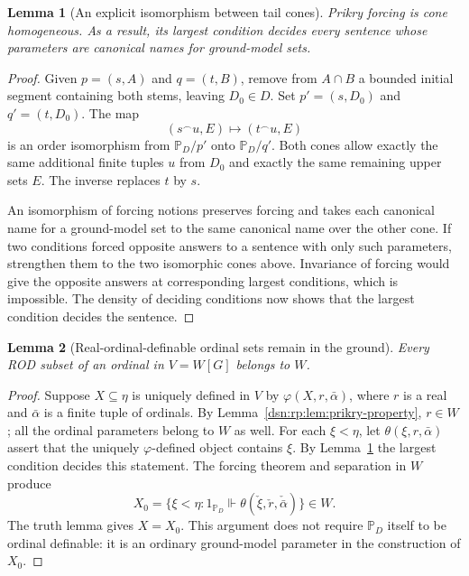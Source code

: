 \documentclass[11pt,a4paper]{article}
\numberwithin{equation}{section}
\newtheorem{lemma}[lemma]{Lemma}
\theoremstyle{definition}
\theoremstyle{remark}
\begin{document}
\begin{lemma}[An explicit isomorphism between tail cones]
\label{dsn:rp:lem:prikry-cones}
Prikry forcing is cone homogeneous.  As a result, its largest
condition decides every sentence whose parameters are canonical
names for ground-model sets.
\end{lemma}
\begin{proof}
Given $p=(s,A)$ and $q=(t,B)$, remove from $A\cap B$ a bounded initial
segment containing both stems, leaving $D_0\in D$.  Set
$p'=(s,D_0)$ and $q'=(t,D_0)$.  The map
\[
 (s^\frown u,E)\longmapsto(t^\frown u,E)
\]
is an order isomorphism from $\mathbb P_D/p'$ onto
$\mathbb P_D/q'$.  Both cones allow exactly the same additional
finite tuples $u$ from $D_0$ and exactly the same remaining upper
sets $E$.  The inverse replaces $t$ by $s$.

An isomorphism of forcing notions preserves forcing and takes each
canonical name for a ground-model set to the same canonical name
over the other cone.  If two conditions forced opposite answers to
a sentence with only such parameters, strengthen them to the two
isomorphic cones above.  Invariance of forcing would give the
opposite answers at corresponding largest conditions, which is
impossible.  The density of deciding conditions now shows that the
largest condition decides the sentence.
\end{proof}

\begin{lemma}[Real-ordinal-definable ordinal sets remain in the ground]
\label{dsn:rp:lem:prikry-rod-ground}
Every ROD subset of an ordinal in $V=W[G]$ belongs to $W$.
\end{lemma}
\begin{proof}
Suppose $X\subseteq\eta$ is uniquely defined in $V$ by
$\varphi(X,r,\bar\alpha)$, where $r$ is a real and $\bar\alpha$
is a finite tuple of ordinals.  By
Lemma~\ref{dsn:rp:lem:prikry-property}, $r\in W$; all the ordinal
parameters belong to $W$ as well.  For each $\xi<\eta$, let
$\theta(\xi,r,\bar\alpha)$ assert that the uniquely
$\varphi$-defined object contains $\xi$.  By
Lemma~\ref{dsn:rp:lem:prikry-cones} the largest condition decides this
statement.  The forcing theorem and separation in $W$ produce
\[
 X_0=\{\xi<\eta:
   1_{\mathbb P_D}\Vdash\theta(\check\xi,\check r,
                                      \check{\bar\alpha})\}\in W.
\]
The truth lemma gives $X=X_0$.  This argument does not require
$\mathbb P_D$ itself to be ordinal definable: it is an ordinary
ground-model parameter in the construction of $X_0$.
\end{proof}
\end{document}
